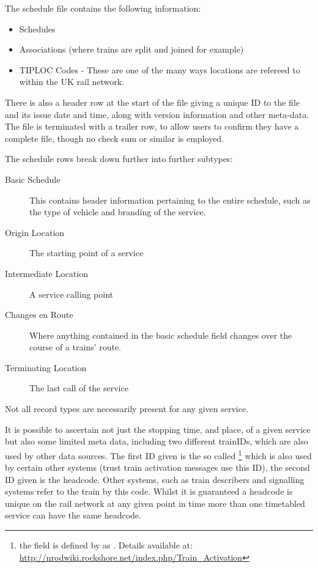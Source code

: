 The schedule file contains the following information:
\begin{itemize}
	\item Schedules
	\item Associations (where trains are split and joined for example)
	\item TIPLOC Codes - These are one of the many ways locations are refereed to within the  UK rail network.
\end{itemize}

There is also a header row at the start of the file giving a unique ID to the file and its issue date and time, along with version information and other meta-data. The file is terminated with a trailer row, to allow users to confirm they have a complete file, though no check sum or similar is employed.

The schedule rows break down further into further subtypes:
\begin{description}
	\item[Basic Schedule] This contains header information pertaining to the entire schedule, such as the type of vehicle and branding of the service.
	\item[Origin Location] The starting point of a service
	\item[Intermediate Location]  A service calling point
	\item[Changes en Route] Where anything contained in the basic schedule field changes over the course of a trains' route.
	\item[Terminating Location] The last call of the service
\end{description}
Not all record types are necessarily present for any given service.

It is possible to ascertain not just the stopping time, and place, of a given service but also some limited meta data, including two different trainIDs, which are also used by other data sources. The first ID given is the so called \footnote{the field is defined by \citet{Hicks} as . Details available at: \url{http://nrodwiki.rockshore.net/index.php/Train_Activation}} which is also used by certain other systems (trust train activation messages use this ID), the second ID given is the headcode. Other systems, such as train describers and signalling systems refer to the train by this code. Whilst it is guaranteed a headcode is unique on the rail network at any given point in time more than one timetabled service can have the same headcode.

